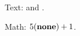 Text:  and .

Math: \(\flmUDqty{\textbf  {none}}{5} + 1\).
\providecommand\flmUDqty[2]{#2 (#1)}
\endinput
